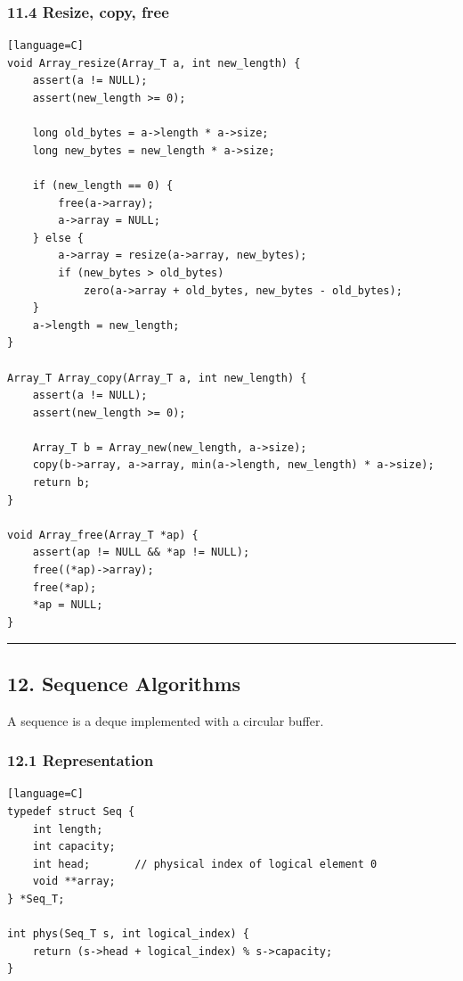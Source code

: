 \documentclass[11pt]{article}
\begin{document}
\subsubsection{11.4 Resize, copy, free}\label{resize-copy-free}

\begin{verbatim}[language=C]
void Array_resize(Array_T a, int new_length) {
    assert(a != NULL);
    assert(new_length >= 0);

    long old_bytes = a->length * a->size;
    long new_bytes = new_length * a->size;

    if (new_length == 0) {
        free(a->array);
        a->array = NULL;
    } else {
        a->array = resize(a->array, new_bytes);
        if (new_bytes > old_bytes)
            zero(a->array + old_bytes, new_bytes - old_bytes);
    }
    a->length = new_length;
}

Array_T Array_copy(Array_T a, int new_length) {
    assert(a != NULL);
    assert(new_length >= 0);

    Array_T b = Array_new(new_length, a->size);
    copy(b->array, a->array, min(a->length, new_length) * a->size);
    return b;
}

void Array_free(Array_T *ap) {
    assert(ap != NULL && *ap != NULL);
    free((*ap)->array);
    free(*ap);
    *ap = NULL;
}
\end{verbatim}

\begin{center}\rule{0.5\linewidth}{0.5pt}\end{center}

\subsection{12. Sequence Algorithms}\label{sequence-algorithms}

A sequence is a deque implemented with a circular buffer.

\subsubsection{12.1 Representation}\label{representation-4}

\begin{verbatim}[language=C]
typedef struct Seq {
    int length;
    int capacity;
    int head;       // physical index of logical element 0
    void **array;
} *Seq_T;

int phys(Seq_T s, int logical_index) {
    return (s->head + logical_index) % s->capacity;
}
\end{verbatim}
\end{document}
